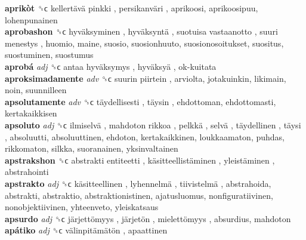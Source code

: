 \textbf{aprikòt} ␝ϲ   kellertävä pinkki ,  persikanväri , aprikoosi, aprikoosipuu, lohenpunainen  \\
\textbf{aprobashon} ␝ϲ   hyväksyminen ,  hyväksyntä ,  suotuisa vastaanotto ,  suuri menestys , huomio, maine, suosio, suosionhuuto, suosionosoitukset, suositus, suostuminen, suostumus  \\
\textbf{aprobá} \emph{adj}  ␝ϲ   antaa hyväksymys ,  hyväksyä ,  ok-kuitata   \\
\textbf{aproksimadamente} \emph{adv}  ␝ϲ   suurin piirtein , arviolta, jotakuinkin, likimain, noin, suunnilleen  \\
\textbf{apsolutamente} \emph{adv}  ␝ϲ   täydellisesti ,  täysin , ehdottoman, ehdottomasti, kertakaikkisen  \\
\textbf{apsoluto} \emph{adj}  ␝ϲ   ilmiselvä ,  mahdoton  rikkoa ,  pelkkä ,  selvä ,  täydellinen ,  täysi , absoluutti, absoluuttinen, ehdoton, kertakaikkinen, loukkaamaton, puhdas, rikkomaton, silkka, suoranainen, yksinvaltainen  \\
\textbf{apstrakshon} ␝ϲ   abstrakti entiteetti ,  käsitteellistäminen ,  yleistäminen , abstrahointi  \\
\textbf{apstrakto} \emph{adj}  ␝ϲ   käsitteellinen ,  lyhennelmä ,  tiivistelmä , abstrahoida, abstrakti, abstraktio, abstraktionistinen, ajatusluomus, nonfiguratiivinen, nonobjektiivinen, yhteenveto, yleiskatsaus  \\
\textbf{apsurdo} \emph{adj}  ␝ϲ   järjettömyys ,  järjetön ,  mielettömyys , absurdius, mahdoton  \\
\textbf{apátiko} \emph{adj}  ␝ϲ   välinpitämätön , apaattinen  \\
